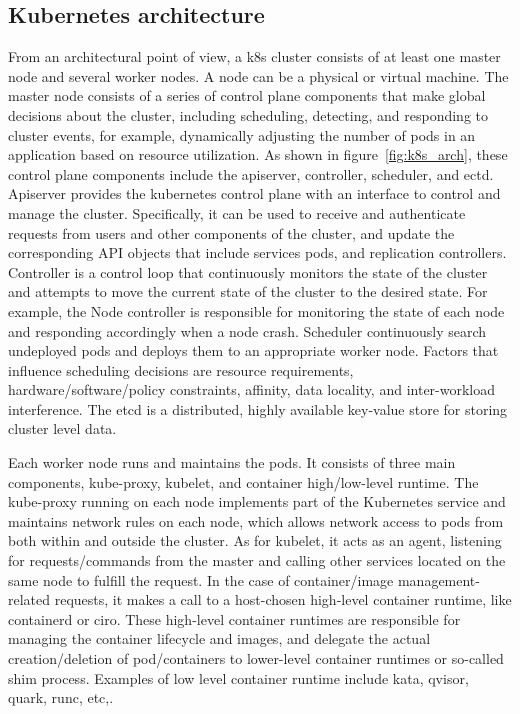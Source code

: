 \subsection{Kubernetes architecture}
From an architectural point of view, a k8s cluster consists of at least one master node and several worker nodes. A node can be a physical or virtual machine. The master node consists of a series of control plane components that make global decisions 
about the cluster, including scheduling, detecting, and responding to cluster events, for example, dynamically adjusting the number of 
pods in an application based on resource utilization. As shown in figure~\ref{fig:k8s_arch}, these control plane components include the apiserver, controller, scheduler, and ectd\cite*{k8s}. Apiserver provides the kubernetes control plane with an 
interface to control and manage the cluster. Specifically, it can be used to receive and authenticate requests from users and other components of the cluster, and update the corresponding API objects that include services pods, and replication 
controllers. Controller is a control loop that continuously monitors the state of the cluster and attempts to move the current state of the cluster to the desired state. For example, the Node controller is responsible for monitoring the state 
of each node and responding accordingly when a node crash. Scheduler continuously search undeployed pods and deploys them to an appropriate worker node. Factors that influence scheduling decisions are resource requirements, 
hardware/software/policy constraints, affinity, data locality, and inter-workload interference. The etcd is a distributed, highly available key-value store for storing cluster level data.


Each worker node runs and maintains the pods. It consists of three main components, kube-proxy, kubelet, and container high/low-level runtime. The kube-proxy running on each node implements part of the Kubernetes service and maintains network rules 
on each node, which allows network access to pods from both within and outside the cluster. As for kubelet, it acts as an agent, listening for requests/commands from the master and calling other services located on the same node to fulfill the 
request. In the case of container/image management-related requests, it makes a call to a host-chosen high-level container runtime, like containerd\cite*{containerd} or ciro\cite*{cri-o}. These high-level container runtimes are responsible for managing the container lifecycle 
and images, and delegate the actual creation/deletion of pod/containers to lower-level container runtimes or so-called shim process. Examples of low level container runtime include kata, qvisor, quark, runc, etc,.


